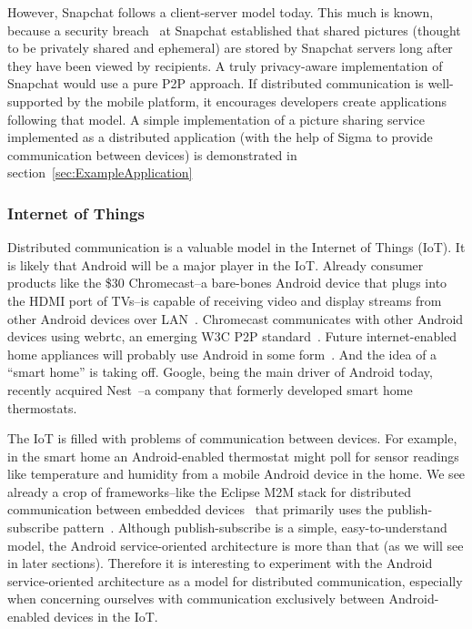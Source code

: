 \documentclass[prodmode]{acmlarge}
\begin{document}
However, Snapchat follows a client-server model today. This much is known, because a security breach~\cite{SnapchatHack} at Snapchat established that shared pictures (thought to be privately shared and ephemeral) are stored by Snapchat servers long after they have been viewed by recipients. A truly privacy-aware implementation of Snapchat would use a pure P2P approach. If distributed communication is well-supported by the mobile platform, it encourages developers create applications following that model. A simple implementation of a picture sharing service implemented as a distributed application (with the help of Sigma to provide communication between devices) is demonstrated in section~\ref{sec:ExampleApplication}

\subsubsection{Internet of Things}
Distributed communication is a valuable model in the Internet of Things (IoT). It is likely that Android will be a major player in the IoT. Already consumer products like the \$30 Chromecast--a bare-bones Android device that plugs into the HDMI port of TVs--is capable of receiving video and display streams from other Android devices over LAN~\cite{chromecast}. Chromecast communicates with other Android devices using webrtc, an emerging W3C P2P standard~\cite{ChromecastWebrtc}. Future internet-enabled home appliances will probably use Android in some form~\cite{AndroidEverywhere}. And the idea of a ``smart home'' is taking off. Google, being the main driver of Android today, recently acquired Nest~\cite{GoogleNest}--a company that formerly developed smart home thermostats.

The IoT is filled with problems of communication between devices. For example, in the smart home an Android-enabled thermostat might poll for sensor readings like temperature and humidity from a mobile Android device in the home. We see already a crop of frameworks--like the Eclipse M2M stack for distributed communication between embedded devices~\cite{eclipse_m2m} that primarily uses the publish-subscribe pattern~\cite{PublishSubscribe}. Although publish-subscribe is a simple, easy-to-understand model, the Android service-oriented architecture is more than that (as we will see in later sections). Therefore it is interesting to experiment with the Android service-oriented architecture as a model for distributed communication, especially when concerning ourselves with communication exclusively between Android-enabled devices in the IoT.
\end{document}
